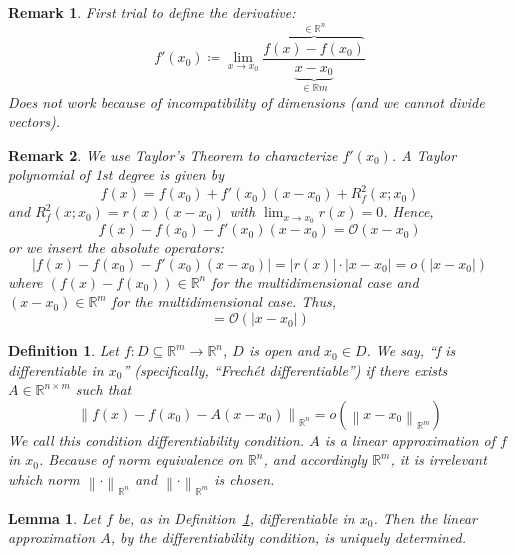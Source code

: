 \documentclass{article}
\newtheorem{definition}{Definition}  \numberwithin{definition}{section}
\newtheorem{lemma}{Lemma}  \numberwithin{lemma}{section}
\newtheorem{remark}{Remark}  \numberwithin{remark}{section}
\newcommand{\norm}[1]{\left\|#1\right\|}
\newcommand{\card}[1]{\left|#1\right|}
\begin{document}
\begin{remark}
  First trial to define the derivative:
  \[ f'(x_0) \coloneqq \lim_{x\to x_0} \frac{\overbrace{f(x) - f(x_0)}^{\in \mathbb R^n}}{\underbrace{x - x_0}_{\in \mathbb Rm}} \]
  Does not work because of incompatibility of dimensions (and we cannot divide vectors).
\end{remark}

\begin{remark}
  We use Taylor's Theorem to characterize $f'(x_0)$. A Taylor polynomial of 1st degree is given by
  \[ f(x) = f(x_0) + f'(x_0) (x - x_0) + R_f^2(x; x_0) \]
  and $R_f^2(x; x_0) = r(x) (x - x_0)$ with $\lim_{x\to x_0} r(x) = 0$.
  Hence,
  \[ f(x) - f(x_0) - f'(x_0)(x - x_0) = \mathcal O(x - x_0) \]
  or we insert the absolute operators:
  \[ \card{f(x) - f(x_0) - f'(x_0) (x - x_0)} = \card{r(x)} \cdot \card{x - x_0} = o(\card{x - x_0}) \]
  where $(f(x) - f(x_0)) \in \mathbb R^n$ for the multidimensional case
  and $(x - x_0) \in \mathbb R^m$ for the multidimensional case. Thus,
  \[ = \mathcal O(\card{x - x_0}) \]
\end{remark}

\begin{definition} %
  \label{defp}
  Let $f: D \subseteq \mathbb R^m \to \mathbb R^n$, $D$ is open and $x_0 \in D$.
  We say, \enquote{f is differentiable in $x_0$} (specifically, \enquote{Frech\'et differentiable})
  if there exists $A \in \mathbb R^{n \times m}$ such that
  \[ \norm{f(x) - f(x_0) - A(x - x_0)}_{\mathbb R^n} = o(\norm{x - x_0}_{\mathbb R^m}) \]
  We call this condition \emph{differentiability condition}.
  $A$ is a linear approximation of $f$ in $x_0$.
  Because of norm equivalence on $\mathbb R^n$, and accordingly $\mathbb R^m$,
  it is irrelevant which norm $\norm{\cdot}_{\mathbb R^n}$ and $\norm{\cdot}_{\mathbb R^m}$ is chosen.
\end{definition}

\begin{lemma} %
  Let $f$ be, as in Definition~\ref{defp}, differentiable in $x_0$.
  Then the linear approximation $A$, by the differentiability condition, is uniquely determined.
\end{lemma}
\end{document}
